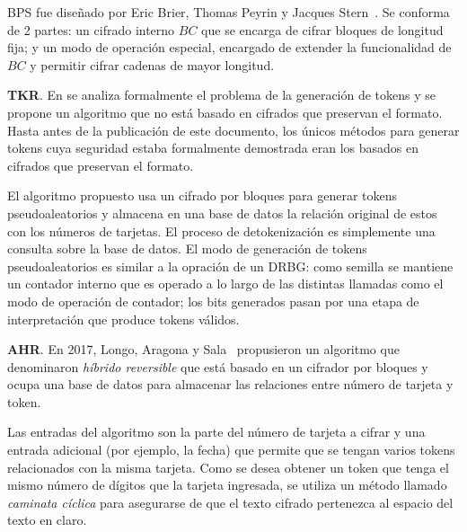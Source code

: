 BPS fue diseñado por Eric Brier, Thomas Peyrin y Jacques Stern~\cite{bps}. Se
conforma de 2 partes: un cifrado interno $BC$ que se encarga de cifrar bloques
de longitud fija; y un modo de operación especial, encargado de extender la
funcionalidad de $BC$ y permitir cifrar cadenas de mayor longitud.


\textbf{TKR}. En \cite{doc_sandra} se analiza formalmente el problema de la
generación de tokens y se propone un algoritmo que no está basado en cifrados
que preservan el formato. Hasta antes de la publicación de este documento, los
únicos métodos para generar tokens cuya seguridad estaba formalmente demostrada
eran los basados en cifrados que preservan el formato.

El algoritmo propuesto usa un cifrado por bloques para generar tokens
pseudoaleatorios y almacena en una base de datos la relación original de estos
con los números de tarjetas. El proceso de detokenización es simplemente una
consulta sobre la base de datos. El modo de generación de tokens
pseudoaleatorios es similar a la opración de un DRBG: como semilla se mantiene
un contador interno que es operado a lo largo de las distintas llamadas como el
modo de operación de contador; los bits generados pasan por una etapa de
interpretación que produce tokens válidos.

\textbf{AHR}. En 2017, Longo, Aragona y Sala~\cite{aragona} propusieron un
algoritmo que denominaron \textit{híbrido reversible} que está basado en un
cifrador por bloques y ocupa una base de datos para almacenar las relaciones
entre número de tarjeta y token.

Las entradas del algoritmo son la parte del número de tarjeta a cifrar y una
entrada adicional (por ejemplo, la fecha) que permite que se tengan varios
tokens relacionados con la misma tarjeta. Como se desea obtener un token que
tenga el mismo número de dígitos que la tarjeta ingresada, se utiliza un método
llamado \textit{caminata cíclica} para asegurarse de que el texto cifrado
pertenezca al espacio del texto en claro.

